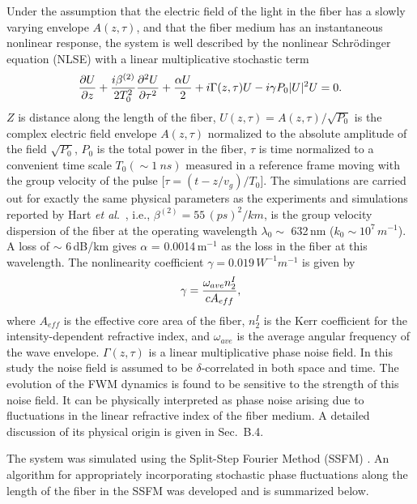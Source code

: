 Under the assumption that the electric field of the light in the fiber has a 
slowly varying envelope $A(z,\tau)$, and that the fiber medium has an 
instantaneous nonlinear response, the system is well described by the 
nonlinear Schr\"{o}dinger equation (NLSE) with a linear multiplicative
stochastic term
\begin{equation}
{\partial U \over \partial z} + {i\beta^{(2)} \over 2T_0^2} 
{\partial^2 U \over \partial\tau^2} + {\alpha U \over 2}
 + i\Gamma(z,\tau)U-i\gamma P_0 |U|^2 U = 0.
\end{equation}
$Z$ is distance along the length of the fiber, 
$U(z,\tau)=A(z,\tau)/\sqrt{P_0}$ is the complex electric field envelope 
$A(z,\tau)$ normalized to the absolute amplitude of the field $\sqrt{P_0}$, 
$P_0$ is the total power in the fiber, $\tau$ is time normalized to a 
convenient time scale $T_0(\sim 1\ ns)$ measured in a reference frame 
moving with the group velocity of the pulse [$\tau=(t-z/v_g)/T_0$]. The 
simulations are carried out for exactly the same physical parameters as the 
experiments and simulations reported by Hart {\it et al}.\ \cite{hart1}, i.e., 
$\beta^{(2)}=55\,(ps)^2/km$, is the group velocity dispersion of the fiber at 
the operating wavelength $\lambda_{0}\sim$ 632\,nm 
($k_0\sim 10^7\,m^{-1}$). A loss of $\sim$ 6\,dB/km gives $\alpha$ = 0.0014\,m$^{-1}$ as the 
loss in the fiber at this wavelength. The nonlinearity coefficient 
$\gamma=0.019\,W^{-1}m^{-1}$ is given by 
\begin{equation}
\gamma = {\omega_{ave}n_2^I \over cA_{eff}},
\end{equation}
where $A_{eff}$ is the effective core area of the fiber,
$n_2^I$ is the Kerr coefficient for the intensity-dependent refractive index, and 
$\omega_{ave}$ is the average angular frequency of the wave envelope. 
$\Gamma(z,\tau)$ is a linear multiplicative phase noise field. In this study 
the noise field is assumed to be $\delta$-correlated in both space and time. 
The evolution of the FWM dynamics is found to be sensitive to the strength of 
this noise field. It can be physically interpreted as phase noise arising due 
to fluctuations in the linear refractive index of the fiber medium. A detailed 
discussion of its physical origin is given in Sec.\ B.4.

The system was simulated using the Split-Step Fourier Method (SSFM) 
\cite{Agrawal2}. An algorithm for appropriately incorporating stochastic
phase fluctuations along the length of the fiber in the SSFM was developed
and is summarized below.

